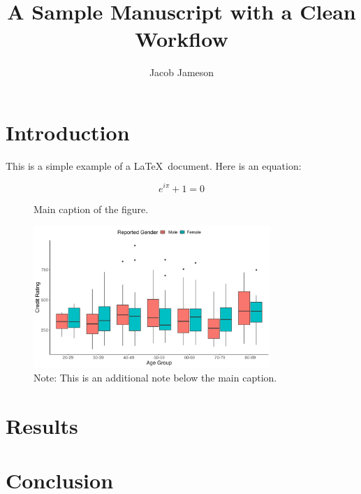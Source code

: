 \documentclass{article}
\begin{document}
\title{A Sample Manuscript with a Clean Workflow}
\author{Jacob Jameson}

\maketitle

\section{Introduction}

This is a simple example of a \LaTeX\ document. Here is an equation:

\begin{equation}
    e^{i\pi} + 1 = 0
\end{equation}

\lipsum[1]



\begin{figure}[h!]
    \centering
    \caption{Main caption of the figure.}
    \includegraphics[width=0.8\textwidth]{outputs/figures/fig_1.png}
    \captionsetup{justification=centering, font=small} 
    \caption*{Note: This is an additional note below the main caption.}
    \label{fig:fig_1}
\end{figure}

\lipsum[2]

\section{Results}

\lipsum[3]




\section{Conclusion}

\lipsum[4-6]
\end{document}

